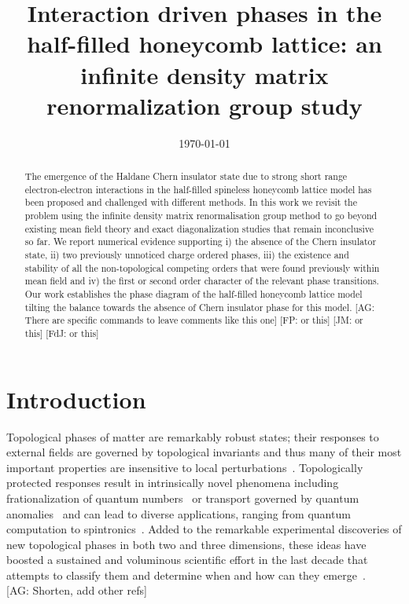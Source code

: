 \documentclass[aps,prx,10pt,twocolumn,floatfix,superscriptaddress,showpacs,numerical,footinbib]{revtex4-1}
\newcommand{\noteAG}[1]{{\color{blue} [AG: #1]}}
\newcommand{\noteFP}[1]{{\color{magenta} [FP: #1]}}
\newcommand{\noteJM}[1]{{\color{red} [JM: #1]}}
\newcommand{\noteFdJ}[1]{{\color{cyan} [FdJ: #1]}}
\begin{document}
%
\title{Interaction driven phases in the half-filled honeycomb lattice: an infinite density matrix renormalization group study}
%
%
\date{\today}
%
\begin{abstract}
%
%
The emergence of the Haldane Chern insulator state due to strong short range electron-electron interactions in the half-filled spineless honeycomb lattice
model has been proposed and challenged with different methods.
%
In this work we revisit the problem using the infinite density matrix renormalisation group method to go beyond existing mean field theory and exact
diagonalization studies that remain inconclusive so far.
%
We report numerical evidence supporting 
i) the absence of the Chern insulator state, 
ii) two previously unnoticed charge ordered phases, 
iii) the existence and stability of all the non-topological competing orders that were found previously within mean field and
iv) the first or second order character of the relevant phase transitions.
%
Our work establishes the phase diagram of the half-filled honeycomb lattice model tilting the balance
towards the absence of Chern insulator phase for this model.
%
\noteAG{There are specific commands to leave comments like this one}\noteFP{or this}\noteJM{or this}\noteFdJ{or this}
%
\end{abstract}
%
\maketitle
%

\section{Introduction}
%
Topological phases of matter are remarkably robust states; their responses to external fields are
governed by topological invariants and thus many of their most important properties are insensitive to local perturbations~\cite{HK10,QZ11}.
%
Topologically protected responses result in intrinsically novel phenomena
including frationalization of quantum numbers~\cite{Nayak2008} or transport governed by quantum anomalies~\cite{V03}
and can lead to diverse applications, ranging from quantum computation to spintronics~\cite{HK10,QZ11,Nayak2008}.
%
Added to the remarkable experimental discoveries of new topological phases in both two and three dimensions,
these ideas have boosted a sustained and voluminous scientific effort in the last decade that attempts to classify them 
and determine when and how can they emerge~\cite{HK10,QZ11}.\\
\noteAG{Shorten, add other refs}
%
\end{document}
